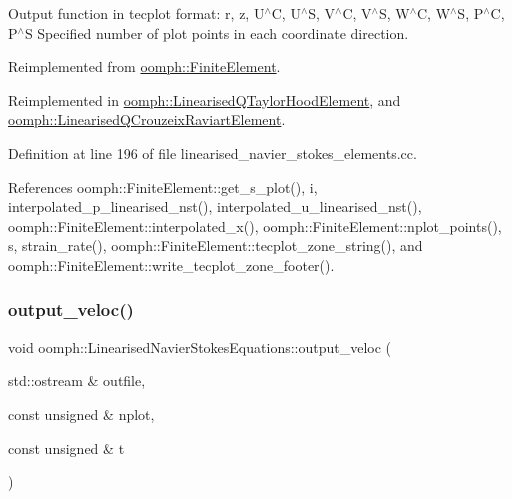 Output function in tecplot format\+: r, z, U$^\wedge$C, U$^\wedge$S, V$^\wedge$C, V$^\wedge$S, W$^\wedge$C, W$^\wedge$S, P$^\wedge$C, P$^\wedge$S Specified number of plot points in each coordinate direction. 

Reimplemented from \hyperlink{classoomph_1_1FiniteElement_adfaee690bb0608f03320eeb9d110d48c}{oomph\+::\+Finite\+Element}.



Reimplemented in \hyperlink{classoomph_1_1LinearisedQTaylorHoodElement_a2725e5c308afb58f54dfb16aef114a31}{oomph\+::\+Linearised\+Q\+Taylor\+Hood\+Element}, and \hyperlink{classoomph_1_1LinearisedQCrouzeixRaviartElement_a7418df580bdf0c2fd4dccc263997222e}{oomph\+::\+Linearised\+Q\+Crouzeix\+Raviart\+Element}.



Definition at line 196 of file linearised\+\_\+navier\+\_\+stokes\+\_\+elements.\+cc.



References oomph\+::\+Finite\+Element\+::get\+\_\+s\+\_\+plot(), i, interpolated\+\_\+p\+\_\+linearised\+\_\+nst(), interpolated\+\_\+u\+\_\+linearised\+\_\+nst(), oomph\+::\+Finite\+Element\+::interpolated\+\_\+x(), oomph\+::\+Finite\+Element\+::nplot\+\_\+points(), s, strain\+\_\+rate(), oomph\+::\+Finite\+Element\+::tecplot\+\_\+zone\+\_\+string(), and oomph\+::\+Finite\+Element\+::write\+\_\+tecplot\+\_\+zone\+\_\+footer().

\mbox{\label{classoomph_1_1LinearisedNavierStokesEquations_a4eaf26ee7af0a56c20a11d378414a66f}} 
\subsubsection{\texorpdfstring{output\+\_\+veloc()}{output\_veloc()}}
{\footnotesize\ttfamily void oomph\+::\+Linearised\+Navier\+Stokes\+Equations\+::output\+\_\+veloc (\begin{DoxyParamCaption}\item[{std\+::ostream \&}]{outfile,  }\item[{const unsigned \&}]{nplot,  }\item[{const unsigned \&}]{t }\end{DoxyParamCaption})}



